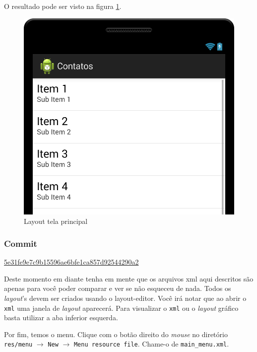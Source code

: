 O resultado pode ser visto na figura \ref{fig:activity-main-1}.

\begin{figure}[h]
    \center
    \includegraphics[scale=0.3]{img/exemplo-pratico/activity_main-1.png}
    \caption{Layout tela principal}
    \label{fig:activity-main-1}
\end{figure}

\subsubsection{Commit}

\href{https://github.com/atilacamurca/guia-aberto-android-contatos/commit/5e31fe9e7c9b15596ae6bfe1ca857d92544290a2}{5e31fe9e7c9b15596ae6bfe1ca857d92544290a2}

Deste momento em diante tenha em mente que os arquivos \gls{xml} aqui
descritos são apenas para você poder comparar e ver se não esqueceu de
nada. Todos os \emph{layout}'s devem ser criados usando o
\gls{layout-editor}. Você irá notar que ao abrir o \texttt{xml} uma
janela de \emph{layout} aparecerá. Para visualizar o \texttt{xml} ou o
\emph{layout} gráfico basta utilizar a aba inferior esquerda.

Por fim, temos o menu. Clique com o botão direito do \emph{mouse} no
diretório \texttt{res/menu} $\rightarrow$ \texttt{New} $\rightarrow$
\texttt{Menu resource file}. Chame-o de \texttt{main\_menu.xml}.

